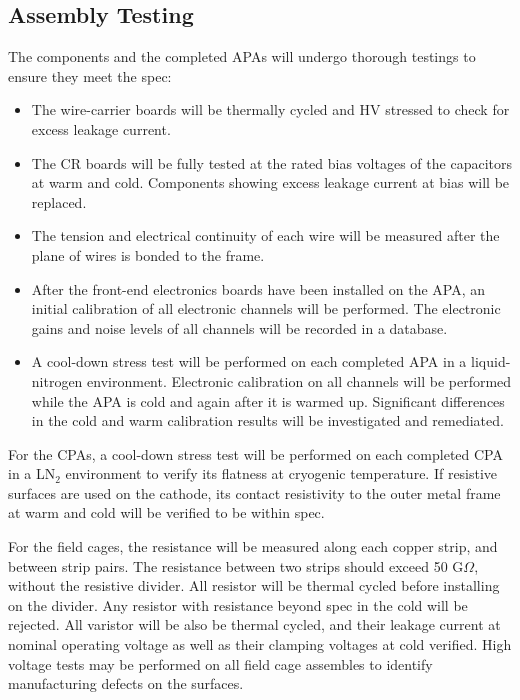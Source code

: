 \subsection{Assembly Testing}
\label{sec:v5-tpc-checkout-test}

The components and the completed APAs will undergo thorough testings to ensure they meet the spec:
\begin{itemize}

\item The wire-carrier boards will be thermally cycled and HV stressed to check for excess leakage current.
\item The CR boards will be fully tested at the rated bias voltages of the capacitors at warm and cold.  Components showing excess leakage current at bias will be replaced.
\item The tension and electrical continuity of each wire will be 
measured after the plane of wires is bonded to the frame.
\item After the front-end electronics boards have been installed on 
the APA, an initial calibration of all electronic channels will be 
performed.  The electronic gains and noise levels of all channels will be 
recorded in a database.
\item A cool-down stress test will be performed on each completed 
APA in a liquid-nitrogen environment.  Electronic calibration on 
all channels will be performed while the APA is cold and again
after it is warmed up.  Significant differences in the cold and warm calibration 
results will be investigated and remediated.  
\end{itemize}

For the CPAs, a cool-down stress test will be performed on each completed 
CPA in a LN$_2$ environment to verify its flatness at cryogenic temperature. If resistive surfaces are used on the cathode, its contact resistivity to the outer metal frame at warm and cold will be verified to be within spec. 

For the field cages,  the resistance will be measured along each copper strip,  
and between strip pairs.  The resistance between two 
strips should exceed 50 G$\Omega$, without the resistive divider.  All resistor will be thermal cycled before installing on the divider.  Any resistor with resistance beyond spec in the cold will be rejected. All varistor will be also be thermal cycled, and their leakage current at nominal operating voltage as well as their clamping voltages at cold verified.  High voltage tests may be performed on all field cage assembles to identify manufacturing defects on the surfaces. 

